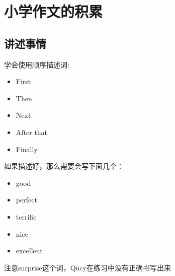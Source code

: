 \section{小学作文的积累}

  \subsection{讲述事情}
学会使用顺序描述词:

\begin{itemize}
    \item First
    \item Then
    \item Next
    \item After that
    \item Finally
\end{itemize}

如果描述好，那么需要会写下面几个：

\begin{itemize}
    \item good
    \item perfect
    \item terrific
    \item nice
    \item excellent
\end{itemize}

注意surprise这个词，Qucy在练习中没有正确书写出来